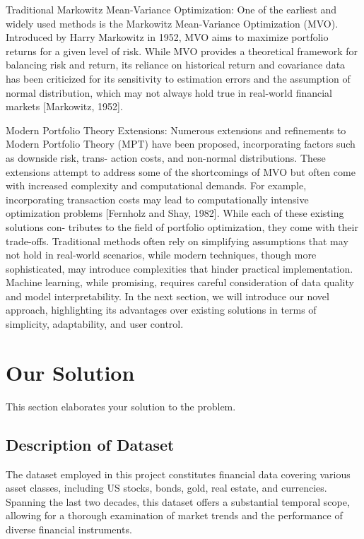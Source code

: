 \documentclass[conference]{IEEEtran}
\begin{document}
Traditional Markowitz Mean-Variance Optimization: 
One of the earliest and widely used methods is the Markowitz Mean-Variance Optimization (MVO). Introduced by Harry Markowitz in 1952, MVO aims to maximize portfolio returns for a given level of risk. While MVO provides a theoretical framework for balancing risk and return, its reliance on historical return and covariance data has been criticized for its sensitivity to estimation errors and the assumption of normal distribution, which may not always hold true in real-world financial markets [Markowitz, 1952].

Modern Portfolio Theory Extensions: 
Numerous extensions and refinements to Modern Portfolio Theory (MPT) have been proposed, incorporating factors such as downside risk, trans- action costs, and non-normal distributions. These extensions attempt to address some of the shortcomings of MVO but often come with increased complexity and computational demands. For example, incorporating transaction costs may lead to computationally intensive optimization problems [Fernholz and Shay, 1982]. While each of these existing solutions con- tributes to the field of portfolio optimization, they come with their trade-offs. Traditional methods often rely on simplifying assumptions that may not hold in real-world scenarios, while modern techniques, though more sophisticated, may introduce complexities that hinder practical implementation. Machine learning, while promising, requires careful consideration of data quality and model interpretability. In the next section, we will introduce our novel approach, highlighting its advantages over existing solutions in terms of simplicity, adaptability, and user control.

\section{Our Solution}
This section elaborates your solution to the problem.

\subsection{Description of Dataset}
The dataset employed in this project constitutes financial data covering various asset classes, including US stocks, bonds, gold, real estate, and currencies. Spanning the last two decades, this dataset offers a substantial temporal scope, allowing for a thorough examination of market trends and the performance of diverse financial instruments.
\end{document}
